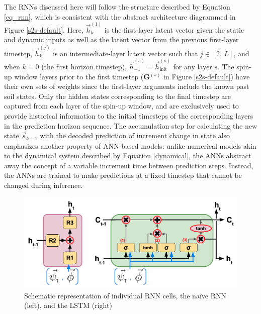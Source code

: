 The RNNs discussed here will follow the structure described by Equation \ref{eq_rnn}, which is consistent with the abstract architecture diagrammed in Figure \ref{s2s-default}. Here, $\vec{h}_k^{(1)}$ is the first-layer latent vector given the static and dynamic inputs as well as the latent vector from the previous first-layer timestep, $\vec{h}_k^{(j)}$ is an intermediate-layer latent vector such that $j \in [2,\,L]$, and when $k=0$ (the first horizon timestep), $\vec{h}^{(s)}_{-1} = \vec{h}^{(s)}_{\text{init}}$ for any layer $s$. The spin-up window layers prior to the first timestep (\textbf{G}$^{(s)}$ in Figure \ref{s2s-default}) have their own sets of weights since the first-layer arguments include the known past soil states. Only the hidden states corresponding to the final timestep are captured from each layer of the spin-up window, and are exclusively used to provide historical information to the initial timesteps of the corresponding layers in the prediction horizon sequence. The accumulation step for calculating the new state $\vec{s}_{k+1}$ with the decoded prediction of increment change in state also emphasizes another property of ANN-based models: unlike numerical models akin to the dynamical system described by Equation \ref{dynamical}, the ANNs abstract away the concept of a variable increment time between prediction steps. Instead, the ANNs are trained to make predictions at a fixed timestep that cannot be changed during inference.

\begin{figure}[ht]
    \centering

    \includegraphics[width=.95\linewidth]{Figures/schematic_rnns-both.png}

    \caption{Schematic representation of individual RNN cells, the na\"ive RNN (left), and the LSTM (right)}
    \label{rnns-both}
\end{figure}

